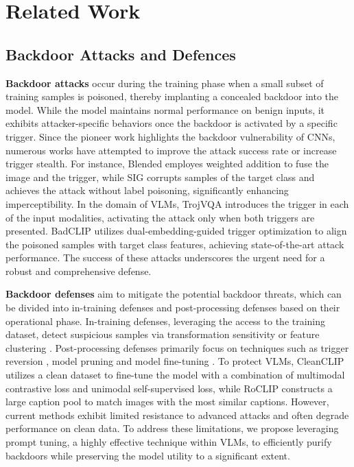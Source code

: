 \section{Related Work}
\label{sec:related work}

\subsection{Backdoor Attacks and Defences}
\textbf{Backdoor attacks} occur during the training phase when a small subset of training samples is poisoned, thereby implanting a concealed backdoor into the model. While the model maintains normal performance on benign inputs, it exhibits attacker-specific behaviors once the backdoor is activated by a specific trigger. Since the pioneer work \cite{gu2019badnets} highlights the backdoor vulnerability of CNNs, numerous works \cite{chen2017targeted, barni2019new, li2021invisible, nguyen2021wanet} have attempted to improve the attack success rate or increase trigger stealth. For instance, Blended \cite{chen2017targeted} employes weighted addition to fuse the image and the trigger, while SIG \cite{barni2019new} corrupts samples of the target class and achieves the attack without label poisoning, significantly enhancing imperceptibility. In the domain of VLMs, TrojVQA \cite{walmer2022dual} introduces the trigger in each of the input modalities, activating the attack only when both triggers are presented. BadCLIP \cite{liang2024badclip} utilizes dual-embedding-guided trigger optimization to align the poisoned samples with target class features, achieving state-of-the-art attack performance. The success of these attacks underscores the urgent need for a robust and comprehensive defense.

\textbf{Backdoor defenses} aim to mitigate the potential backdoor threats, which can be divided into in-training defenses and post-processing defenses based on their operational phase. In-training defenses, leveraging the access to the training dataset,  detect suspicious samples via transformation sensitivity \cite{chen2022effective} or feature clustering \cite{huang2022backdoor}. Post-processing defenses primarily focus on techniques such as trigger reversion \cite{wang2019neural, chen2019deepinspect}, model pruning \cite{liu2018fine, wu2021adversarial, li2023reconstructive} and model fine-tuning \cite{li2021neural, zeng2021adversarial}. To protect VLMs, CleanCLIP \cite{bansal2023cleanclip} utilizes a clean dataset to fine-tune the model with a combination of multimodal contrastive loss and unimodal self-supervised loss, while RoCLIP \cite{yang2024robust} constructs a large caption pool to match images with the most similar captions. However, current methods exhibit limited resistance to advanced attacks and often degrade performance on clean data. 
To address these limitations, we propose leveraging prompt tuning, a highly effective technique within VLMs, to efficiently purify backdoors while preserving the model utility to a significant extent.
